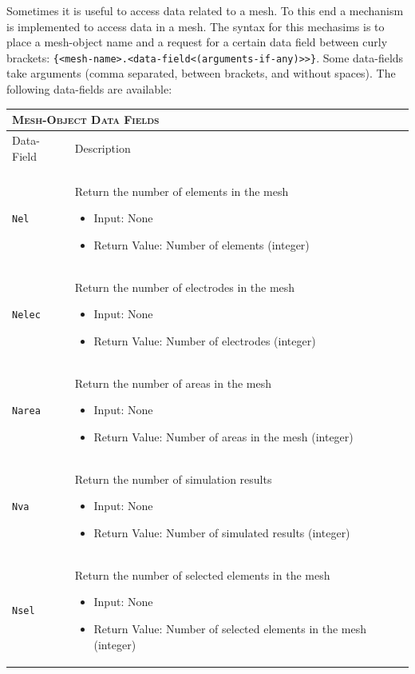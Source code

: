 \documentclass[noshowpacs,preprintnumbers,amsmath,amssymb, letter]{revtex4}
\begin{document}
Sometimes it is useful to access data related to a mesh. To this end a mechanism is implemented to access data in a mesh. The syntax for this mechasims is to place a mesh-object name and a request for a certain data field between curly brackets: \texttt{\{\textless mesh-name\textgreater.\textless data-field\textless(arguments-if-any)\textgreater\textgreater\}}. Some data-fields take arguments (comma separated, between brackets, and without spaces). The following data-fields are available:
\begin{longtable}{p{}p{}}
\multicolumn{2}{l}{\textsc{Mesh-Object Data Fields}} \\*
\hline
Data-Field & Description \\
\hline\\
\texttt{Nel} 	& Return the number of elements in the mesh
\begin{itemize}
\item Input: None
\item Return Value: Number of elements (integer)
\end{itemize}\\
\texttt{Nelec} 	& Return the number of electrodes in the mesh
\begin{itemize}
\item Input: None
\item Return Value: Number of electrodes (integer)
\end{itemize}\\
\texttt{Narea} 	& Return the number of areas in the mesh
\begin{itemize}
\item Input: None
\item Return Value: Number of areas in the mesh (integer)
\end{itemize}\\
\texttt{Nva} 	& Return the number of simulation results
\begin{itemize}
\item Input: None
\item Return Value: Number of simulated results (integer)
\end{itemize}\\
\texttt{Nsel} 	& Return the number of selected elements in the mesh
\begin{itemize}
\item Input: None
\item Return Value: Number of selected elements in the mesh (integer)
\end{itemize}\\

\end{longtable}
\end{document}
